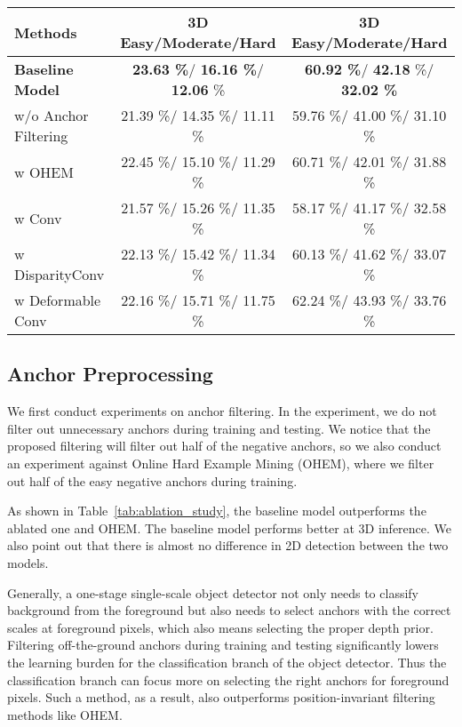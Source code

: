 \documentclass[letterpaper, 10 pt, journal, twoside]{IEEEtran}
\begin{document}
\begin{table*}
   \caption{3D Detection Ablation Study Results of Car on KITTI Validation Set}
   \centering
   \begin{tabular*}{0.76\textwidth}{  @{\extracolsep{\fill}} l| c|c }
      \toprule
       {\bf Methods} & {\bf  3D Easy/Moderate/Hard } &  {\bf  3D Easy/Moderate/Hard}  \\ \midrule
       \textbf{Baseline Model}  & \textbf{23.63 \%}/  \textbf{16.16 \%}/   \textbf{12.06} \% & \textbf{60.92 \%}/   \textbf{42.18} \%/  \textbf{32.02 \%}  \\
       \hline
    w/o Anchor Filtering & 21.39 \%/   14.35 \%/ 11.11  \% & 59.76 \%/    41.00 \%/   31.10 \% \\
    w OHEM & 22.45 \%/   15.10 \%/ 11.29  \% & 60.71 \%/    42.01 \%/   31.88 \% \\
    \hline
    w Conv                 & 21.57 \%/   15.26 \%/ 11.35  \% & 58.17 \%/    41.17 \%/   32.58 \% \\
    w DisparityConv       & 22.13 \%/   15.42 \%/ 11.34  \% & 60.13 \%/    41.62 \%/   33.07 \% \\
    w Deformable Conv      & 22.16 \%/   15.71 \%/ 11.75  \% & 62.24 \%/    43.93 \%/   33.76 \% \\

       \bottomrule
   \end{tabular*} \label{tab:ablation_study}
\end{table*}
\subsection{Anchor Preprocessing}
\label{subsection:ablation_data}
We first conduct experiments on anchor filtering. In the experiment, we do not filter out unnecessary anchors during training and testing. We notice that the proposed filtering will filter out half of the negative anchors, so we also conduct an experiment against Online Hard Example Mining (OHEM), where we filter out half of the easy negative anchors during training\cite{OHEM2016Shrivastava}.

As shown in Table~\ref{tab:ablation_study}, the baseline model outperforms the ablated one and OHEM.  The baseline model performs better at 3D inference. We also point out that there is almost no difference in 2D detection between the two models.

Generally, a one-stage single-scale object detector not only needs to classify background from the foreground but also needs to select anchors with the correct scales at foreground pixels, which also means selecting the proper depth prior. Filtering off-the-ground anchors during training and testing significantly lowers the learning burden for the classification branch of the object detector. Thus the classification branch can focus more on selecting the right anchors for foreground pixels. Such a method, as a result, also outperforms position-invariant filtering methods like OHEM.
\end{document}
